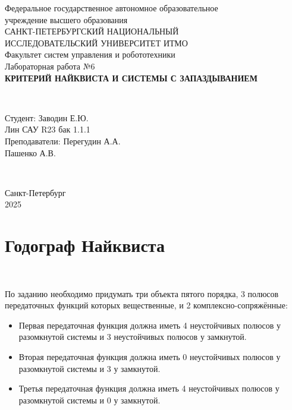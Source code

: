 \documentclass[a4paper]{article}
\begin{document}
\begin{titlepage}
    \begin{center}
        Федеральное государственное автономное образовательное \\ учреждение высшего образования \\[6pt]
        САНКТ-ПЕТЕРБУРГСКИЙ НАЦИОНАЛЬНЫЙ \\ ИССЛЕДОВАТЕЛЬСКИЙ УНИВЕРСИТЕТ ИТМО \\[16pt]
        Факультет систем управления и робототехники \\[26em]
        Лабораторная работа №6\\[0.5em]
        \textbf{КРИТЕРИЙ НАЙКВИСТА И СИСТЕМЫ С ЗАПАЗДЫВАНИЕМ}
    \end{center}\,\\[10em]
    \begin{flushright}
        Студент: Заводин Е.Ю.\\
        Лин САУ R23 бак 1.1.1 \\[0.5em]
        Преподаватели: Перегудин А.А.\\
        Пашенко А.В.
    \end{flushright}\,\\[6em]
    \begin{center}
        {\small Санкт-Петербург \\ 2025}
    \end{center}
\end{titlepage}
\setcounter{page}{2}
\tableofcontents\newpage

\section{Годограф Найквиста}\

По заданию необходимо придумать три объекта пятого порядка, 3 полюсов передаточных функций которых вещественные, и 2 комплексно-сопряжённые:

\begin{itemize}
    \item Первая передаточная функция должна иметь 4 неустойчивых полюсов у разомкнутой системы и 3 неустойчивых полюсов у замкнутой.
    \item Вторая передаточная функция должна иметь 0 неустойчивых полюсов у разомкнутой системы и 3 у замкнутой.
    \item Третья передаточная функция должна иметь 4 неустойчивых полюсов у разомкнутой системы и 0 у замкнутой.
\end{itemize}\
\end{document}
